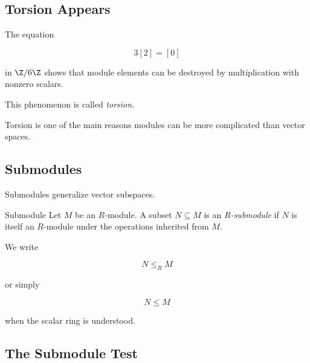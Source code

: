 \subsection{Torsion Appears}
\label{subsec:module-torsion-preview}

The equation

\[ 3[2]=[0] \]

in \(\Z/6\Z\) shows that module elements can be destroyed by multiplication
with nonzero scalars.

This phenomenon is called \emph{torsion}.

\begin{center}
\end{center}

Torsion is one of the main reasons modules can be more complicated than
vector spaces.

\subsection{Submodules}
\label{subsec:submodules}

Submodules generalize vector subspaces.

\begin{definitionbox}{Submodule}
Let \(M\) be an \(R\)-module. A subset \(N\subseteq M\) is an
\emph{\(R\)-submodule} if \(N\) is itself an \(R\)-module under the operations
inherited from \(M\).
\end{definitionbox}

We write

\[ N\leq_R M \]

or simply

\[ N\leq M \]

when the scalar ring is understood.

\subsection{The Submodule Test}
\label{subsec:submodule-test}


